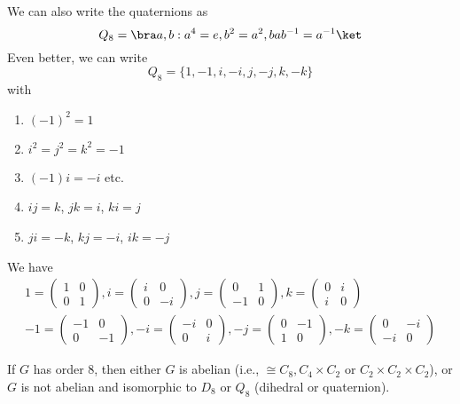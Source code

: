\documentclass[a4paper]{article}
\begin{document}
  \begin{notation}
    We can also write the quaternions as
    \[
      Q_8 = \bra a, b : a^4 = e, b^2 = a^2, bab^{-1} = a^{-1}\ket
    \]
    Even better, we can write
    \[
      Q_8 = \{1, -1, i, -i, j, -j, k, -k\}
    \]
    with
    \begin{enumerate}
      \item $(-1)^2 = 1$
      \item $i^2 = j^2 = k^2 = -1$
      \item $(-1)i = -i$ etc.
      \item $ij = k$, $jk = i$, $ki = j$
      \item $ji = -k$, $kj = -i$, $ik = -j$
    \end{enumerate}
    We have
    \begin{gather*}
      1 = \begin{pmatrix}
        1&0\\0&1
      \end{pmatrix}, 
      i = \begin{pmatrix}
        i & 0\\0&-i
      \end{pmatrix},
      j = \begin{pmatrix}
        0&1\\-1&0
      \end{pmatrix},
      k = \begin{pmatrix}
        0&i\\i&0
      \end{pmatrix}\\
      -1 = \begin{pmatrix}
        -1&0\\0&-1
      \end{pmatrix}, 
      -i = \begin{pmatrix}
        -i & 0\\0&i
      \end{pmatrix},
      -j = \begin{pmatrix}
        0&-1\\1&0
      \end{pmatrix},
      -k = \begin{pmatrix}
        0&-i\\-i&0
      \end{pmatrix}
    \end{gather*}
  \end{notation}

  \begin{lemma}
    If $G$ has order 8, then either $G$ is abelian (i.e., $\cong C_8, C_4\times C_2$ or $C_2\times C_2\times C_2$), or $G$ is not abelian and isomorphic to $D_8$ or $Q_8$ (dihedral or quaternion).
  \end{lemma}
\end{document}
